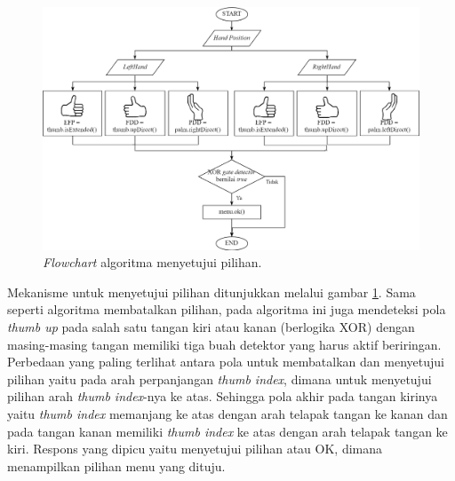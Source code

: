 	 		\begin{figure} [H]
	 			\includegraphics[width=\textwidth]{img/bab3/flow_setuju.png}
	 			\caption{\textit{Flowchart} algoritma menyetujui pilihan.}
	 			\label{fig:flow_setuju}
	 		\end{figure}
 			\vspace{-2ex}
 			 Mekanisme untuk menyetujui pilihan ditunjukkan melalui gambar \ref{fig:flow_setuju}. Sama seperti algoritma membatalkan pilihan, pada algoritma ini juga mendeteksi pola \textit{thumb up} pada salah satu tangan kiri atau kanan (berlogika XOR) dengan masing-masing tangan memiliki tiga buah detektor yang harus aktif beriringan. Perbedaan yang paling terlihat antara pola untuk membatalkan dan menyetujui pilihan yaitu pada arah perpanjangan \textit{thumb index}, dimana untuk menyetujui pilihan arah \textit{thumb index}-nya ke atas. Sehingga pola akhir pada tangan kirinya yaitu \textit{thumb index} memanjang ke atas dengan arah telapak tangan ke kanan dan pada tangan kanan memiliki \textit{thumb index} ke atas dengan arah telapak tangan ke kiri. Respons yang dipicu yaitu menyetujui pilihan atau OK, dimana menampilkan pilihan menu yang dituju.
		 \vspace{0.75ex}
\vspace{2ex}
